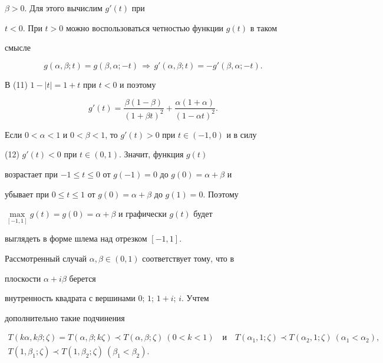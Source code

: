 $\beta>0$. Для этого вычислим $g'(t)$ при


$t<0$. При $t>0$ можно воспользоваться четностью функции $g(t)$ в таком


смысле


\begin{equation}


g(\alpha,\beta;t)=g(\beta,\alpha;-t)\,\Longrightarrow\,


g'(\alpha,\beta;t)=-g'(\beta,\alpha;-t).


\end{equation}


В (11) $1-|t|=1+t$ при $t<0$ и поэтому


$$


g'(t)=\frac{\beta(1-\beta)}{(1+\beta t)^2}+


\frac{\alpha(1+\alpha)}{(1-\alpha t)^2}.


$$





Если $0<\alpha<1$ и $0<\beta<1$, то $g'(t)>0$ при $t\in(-1,0)$ и в силу


(12) $g'(t)<0$ при $t\in(0,1)$. Значит, функция $g(t)$


возрастает при $-1\le t\le 0$ от $g(-1)=0$ до $g(0)=\alpha+\beta$ и


убывает при $0\le t\le 1$ от $g(0)=\alpha+\beta$ до $g(1)=0$. Поэтому


$\max\limits_{[-1,1]}g(t)=g(0)=\alpha+\beta$ и графически $g(t)$ будет


выглядеть в форме шлема над отрезком $[-1,1]$.





Рассмотренный случай $\alpha,\beta\in(0,1)$ соответствует тому, что в


плоскости $\alpha+i\beta$ берется


внутренность квадрата с вершинами $0$; $1$; $1+i$; $i$. Учтем


дополнительно такие подчинения


\begin{gather*}


T(k\alpha,k\beta;\zeta)=T(\alpha,\beta;k\zeta)\prec


T(\alpha,\beta;\zeta) \ (0<k<1)\quad


\text{и} \quad


T(\alpha_1,1;\zeta)\prec T(\alpha_2,1;\zeta)


\ (\alpha_1<\alpha_2), \\


T(1,\beta_1;\zeta)\prec T(1,\beta_2;\zeta)


\ (\beta_1<\beta_2).


\end{gather*}


